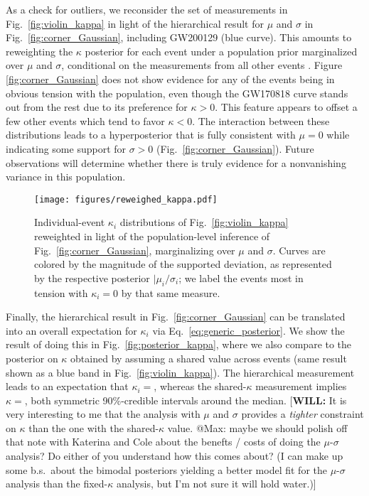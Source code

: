 \documentclass[aps,prd,twocolumn,superscriptaddress,preprintnumbers,floatfix,nofootinbib]{revtex4-2}
\newcommand*{\wf}[1]{\textsf{\color{cyan} [\textbf{WILL:} #1]}}
\begin{document}
As a check for outliers, we reconsider the set of measurements in Fig.~\ref{fig:violin_kappa} in light of the hierarchical result for $\mu$ and $\sigma$ in Fig.~\ref{fig:corner_Gaussian}, including GW200129 (blue curve).
This amounts to reweighting the $\kappa$ posterior for each event under a population prior marginalized over $\mu$ and $\sigma$, conditional on the measurements from all other events \cite{Callister:T2100301}.
Figure \ref{fig:corner_Gaussian} does not show evidence for any of the events being in obvious tension with the population, even though the GW170818 curve stands out from the rest due to its preference for $\kappa > 0$.
This feature appears to offset a few other events which tend to favor $\kappa < 0$.
The interaction between these distributions leads to a hyperposterior that is fully consistent with $\mu = 0$ while indicating some support for $\sigma > 0$ (Fig.~\ref{fig:corner_Gaussian}).
Future observations will determine whether there is truly evidence for a nonvanishing variance in this population.

\begin{figure}
    \texttt{[image: figures/reweighed\_kappa.pdf]}
    \caption{Individual-event $\kappa_i$ distributions of Fig.~\ref{fig:violin_kappa} reweighted in light of the population-level inference of Fig.~\ref{fig:corner_Gaussian}, marginalizing over $\mu$ and $\sigma$. Curves are colored by the magnitude of the supported deviation, as represented by the respective posterior $|\mu_i / \sigma_i$; we label the events most in tension with $\kappa_i = 0$ by that same measure.}
    \label{fig:reweighted_kappa}
\end{figure}

Finally, the hierarchical result in Fig.~\ref{fig:corner_Gaussian} can be translated into an overall expectation for $\kappa_i$ via Eq.~\eqref{eq:generic_posterior}.
We show the result of doing this in Fig.~\ref{fig:posterior_kappa}, where we also compare to the posterior on $\kappa$ obtained by assuming a shared value across events (same result shown as a blue band in Fig.~\ref{fig:violin_kappa}).
The hierarchical measurement leads to an expectation that $\kappa_i = $, whereas the shared-$\kappa$ measurement implies $\kappa = $, both symmetric 90\%-credible intervals around the median.  \wf{It is very interesting to me that the analysis with $\mu$ and $\sigma$ provides a \emph{tighter} constraint on $\kappa$ than the one with the shared-$\kappa$ value.  @Max: maybe we should polish off that note with Katerina and Cole about the benefts / costs of doing the $\mu$-$\sigma$ analysis?  Do either of you understand how this comes about?  (I can make up some b.s.\ about the bimodal posteriors yielding a better model fit for the $\mu$-$\sigma$ analysis than the fixed-$\kappa$ analysis, but I'm not sure it will hold water.)}
\end{document}
